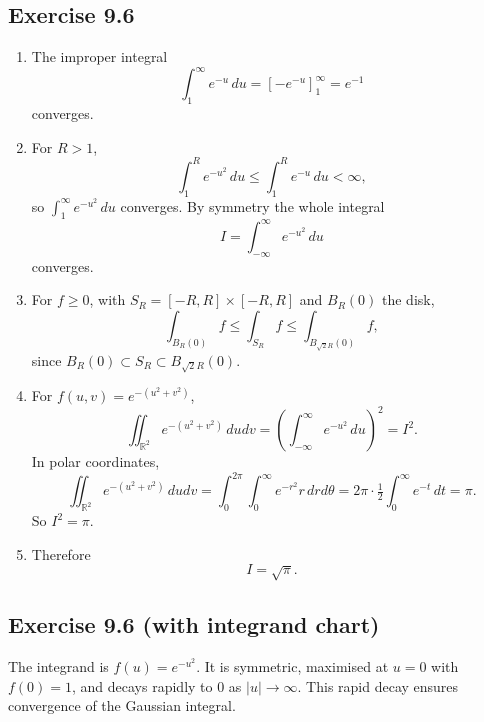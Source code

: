 \documentclass[11pt,a4paper]{article}
\begin{document}
\subsection*{Exercise 9.6}

\begin{enumerate}[label=\alph*)]
	
	\item The improper integral
	\[
	\int_1^\infty e^{-u}\,du = [-e^{-u}]_1^\infty = e^{-1}
	\]
	converges.
	
	\item For $R>1$,
	\[
	\int_1^R e^{-u^2}\,du \leq \int_1^R e^{-u}\,du <\infty,
	\]
	so $\int_1^\infty e^{-u^2}\,du$ converges. By symmetry the whole integral
	\[
	I=\int_{-\infty}^\infty e^{-u^2}\,du
	\]
	converges.
	
	\item For $f\geq 0$, with $S_R=[-R,R]\times[-R,R]$ and $B_R(0)$ the disk,
	\[
	\int_{B_R(0)} f \leq \int_{S_R} f \leq \int_{B_{\sqrt{2}R}(0)} f,
	\]
	since $B_R(0)\subset S_R \subset B_{\sqrt{2}R}(0)$.
	
	\item For $f(u,v)=e^{-(u^2+v^2)}$,
	\[
	\iint_{\mathbb{R}^2} e^{-(u^2+v^2)}\,dudv = \left(\int_{-\infty}^\infty e^{-u^2}\,du\right)^2=I^2.
	\]
	In polar coordinates,
	\[
	\iint_{\mathbb{R}^2} e^{-(u^2+v^2)}\,dudv 
	= \int_0^{2\pi}\int_0^\infty e^{-r^2}r\,drd\theta
	=2\pi\cdot \tfrac{1}{2}\int_0^\infty e^{-t}\,dt = \pi.
	\]
	So $I^2=\pi$.
	
	\item Therefore
	\[
	I=\sqrt{\pi}.
	\]
	
\end{enumerate}

\subsection*{Exercise 9.6 (with integrand chart)}

The integrand is $f(u)=e^{-u^2}$.  
It is symmetric, maximised at $u=0$ with $f(0)=1$, and decays rapidly to $0$ as $|u|\to\infty$.  
This rapid decay ensures convergence of the Gaussian integral.  

\begin{center}
\end{center}
\end{document}
